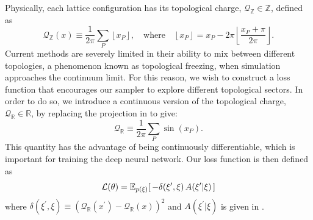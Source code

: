 \documentclass{article} %
\begin{document}
Physically, each lattice configuration has its topological charge, \(\mathcal{Q}_{\mathbb{Z}}\in\mathbb{Z}\), defined as
%
\begin{equation}
      \mathcal{Q}_{\mathbb{Z}}(x) \equiv \frac{1}{2\pi}\sum_{P}\left\lfloor x_{P}\right\rfloor,
   \quad\text{where}\quad \left\lfloor x_{P}\right\rfloor = x_{P} -
   2\pi\left\lfloor\frac{x_{P}+\pi}{2\pi}\right\rfloor.
   \label{eq:intcharge}
\end{equation}
%
Current methods are severely limited in their ability to mix between different topologies, a phenomenon known as topological freezing,
when simulation approaches the continuum limit.
%
For this reason, we wish to construct a loss function that encourages our sampler to explore different topological sectors.
%
In order to do so, we introduce a continuous version of the topological charge, \(\mathcal{Q}_{\mathbb{R}}\in\mathbb{R}\), by replacing the projection in  to give:
%
\begin{equation}
    \mathcal{Q}_{\mathbb{R}} \equiv \frac{1}{2\pi}\sum_{P}\sin(x_{P}).
    \label{eq:sincharge}
\end{equation}
This quantity has the advantage of being continuously differentiable, which is important for training the deep neural network.
%
Our loss function is then defined as
%
\begin{equation}
   \mathcal{L}(\theta) = \mathbb{E}_{p(\xi)}{%
      \left[\,-\delta(\xi^{\prime}, \xi) \, A(\xi^{\prime}|\xi)\,\right]
   }
\end{equation}
%
where \(\delta(\xi^{\prime}, \xi) \equiv {\left(\mathcal{Q}_{\mathbb{R}}(x^{\prime}) - \mathcal{Q}_{\mathbb{R}}(x)\right)}^{2}\) and \(A(\xi^{\prime}|\xi)\) is given in .
%
%
\end{document}
